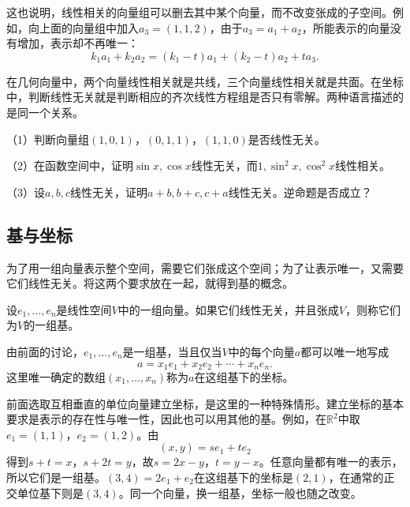 这也说明，线性相关的向量组可以删去其中某个向量，而不改变张成的子空间。例如，向上面的向量组中加入\(a_{3} = \left( 1 , 1 , 2 \right)\)，由于\(a_{3} = a_{1} + a_{2}\)，所能表示的向量没有增加，表示却不再唯一：
\begin{equation}
    k_{1} a_{1} + k_{2} a_{2}
    = \left( k_{1} - t \right) a_{1} + \left( k_{2} - t \right) a_{2} + t a_{3} .
\end{equation}

在几何向量中，两个向量线性相关就是共线，三个向量线性相关就是共面。在坐标中，判断线性无关就是判断相应的齐次线性方程组是否只有零解。两种语言描述的是同一个关系。

\begin{example}
（1）判断向量组\(\left( 1 , 0 , 1 \right)\)，\(\left( 0 , 1 , 1 \right)\)，\(\left( 1 , 1 , 0 \right)\)是否线性无关。

（2）在函数空间中，证明\(\sin x , \cos x\)线性无关，而\(1 , \sin^{2} x , \cos^{2} x\)线性相关。

（3）设\(a , b , c\)线性无关，证明\(a + b , b + c , c + a\)线性无关。逆命题是否成立？
\end{example}

\subsection{基与坐标}
为了用一组向量表示整个空间，需要它们张成这个空间；为了让表示唯一，又需要它们线性无关。将这两个要求放在一起，就得到基的概念。

\begin{definition}\label{def:basis}
设\(e_{1} , \ldots , e_{n}\)是线性空间\(V\)中的一组向量。如果它们线性无关，并且张成\(V\)，则称它们为\(V\)的一组基。
\end{definition}

由前面的讨论，\(e_{1} , \ldots , e_{n}\)是一组基，当且仅当\(V\)中的每个向量\(a\)都可以唯一地写成
\begin{equation}
    a = x_{1} e_{1} + x_{2} e_{2} + \cdots + x_{n} e_{n} .
\end{equation}
这里唯一确定的数组\(\left( x_{1} , \ldots , x_{n} \right)\)称为\(a\)在这组基下的坐标。

前面选取互相垂直的单位向量建立坐标，是这里的一种特殊情形。建立坐标的基本要求是表示的存在性与唯一性，因此也可以用其他的基。例如，在\(\mathbb{R}^{2}\)中取
\(e_{1} = \left( 1 , 1 \right)\)，\(e_{2} = \left( 1 , 2 \right)\)。由
\begin{equation}
    \left( x , y \right) = s e_{1} + t e_{2}
\end{equation}
得到\(s + t = x\)，\(s + 2 t = y\)，故\(s = 2 x - y\)，\(t = y - x\)。任意向量都有唯一的表示，所以它们是一组基。\(\left( 3 , 4 \right) = 2 e_{1} + e_{2}\)在这组基下的坐标是\(\left( 2 , 1 \right)\)，在通常的正交单位基下则是\(\left( 3 , 4 \right)\)。同一个向量，换一组基，坐标一般也随之改变。

